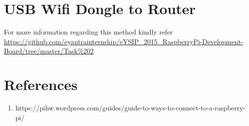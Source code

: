 \documentclass[11pt,a4paper]{article}
\begin{document}
	    \section{USB Wifi Dongle to Router}
	    
	    For more information regarding this method kindly refer \url{https://github.com/eyantrainternship/eYSIP_2015_RaspberryPi-Development-Board/tree/master/Task%202}
	
	\vspace{0.5cm}
	\section{References}
	\begin{enumerate}
		\item https://pihw.wordpress.com/guides/guide-to-ways-to-connect-to-a-raspberry-pi/
	\end{enumerate}
\end{document}
